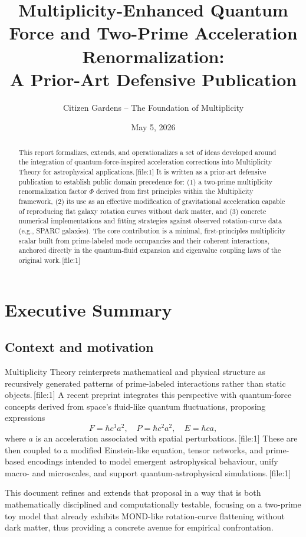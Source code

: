 \documentclass[11pt]{article}
\title{Multiplicity-Enhanced Quantum Force and Two-Prime Acceleration Renormalization:\\
A Prior-Art Defensive Publication}
\author{Citizen Gardens -- The Foundation of Multiplicity}
\date{May 5, 2026}
\begin{document}
\maketitle

\begin{abstract}
This report formalizes, extends, and operationalizes a set of ideas developed around the integration of quantum-force-inspired acceleration corrections into Multiplicity Theory for astrophysical applications.\,[file:1] It is written as a prior-art defensive publication to establish public domain precedence for: (1) a two-prime multiplicity renormalization factor \(\Phi\) derived from first principles within the Multiplicity framework, (2) its use as an effective modification of gravitational acceleration capable of reproducing flat galaxy rotation curves without dark matter, and (3) concrete numerical implementations and fitting strategies against observed rotation-curve data (e.g., SPARC galaxies). The core contribution is a minimal, first-principles multiplicity scalar built from prime-labeled mode occupancies and their coherent interactions, anchored directly in the quantum-fluid expansion and eigenvalue coupling laws of the original work.\,[file:1]
\end{abstract}
\newpage
\tableofcontents

\section*{Executive Summary}

\subsection*{Context and motivation}

Multiplicity Theory reinterprets mathematical and physical structure as recursively generated patterns of prime-labeled interactions rather than static objects.\,[file:1] A recent preprint integrates this perspective with quantum-force concepts derived from space's fluid-like quantum fluctuations, proposing expressions
\[
F = \hbar c^3 a^2,\quad P = \hbar c^2 a^2,\quad E = \hbar c a,
\]
where \(a\) is an acceleration associated with spatial perturbations.\,[file:1] These are then coupled to a modified Einstein-like equation, tensor networks, and prime-based encodings intended to model emergent astrophysical behaviour, unify macro- and microscales, and support quantum-astrophysical simulations.\,[file:1]

This document refines and extends that proposal in a way that is both mathematically disciplined and computationally testable, focusing on a two-prime toy model that already exhibits MOND-like rotation-curve flattening without dark matter, thus providing a concrete avenue for empirical confrontation.
\end{document}
